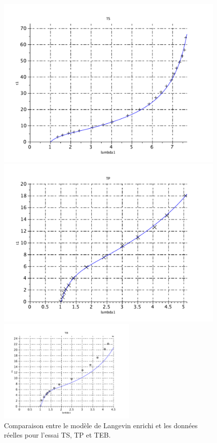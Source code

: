 \documentclass[a4paper,11pt]{article}
\begin{document}
\begin{figure}[!h]
\begin{minipage}{0.49\linewidth}
	\centering\includegraphics[scale=0.45]{scilab_prof/q421.pdf}
\end{minipage}
	\hfill
\begin{minipage}{0.49\linewidth}
	\centering\includegraphics[scale=0.45]{scilab_prof/q422.pdf}
\end{minipage}
\centering\includegraphics[width=0.6\textwidth]{scilab_prof/q423.pdf}
\caption{Comparaison entre le modèle de Langevin enrichi et les données réelles pour l'essai TS, TP et TEB.}
\label{fig:43}
\end{figure}
\end{document}
